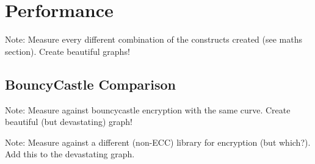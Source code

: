 \section{Performance}
\label{sec:performance}

Note: Measure every different combination of the constructs created (see maths section). Create beautiful graphs!

\subsection{BouncyCastle Comparison}
\label{sec:performance_bouncycastle}
Note: Measure against bouncycastle encryption with the same curve. Create beautiful (but devastating) graph!

Note: Measure against a different (non-ECC) library for encryption (but which?). Add this to the devastating graph.